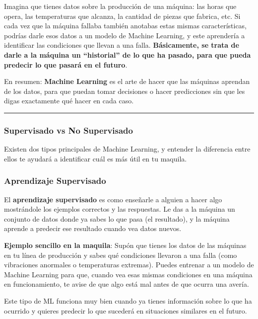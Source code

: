 \documentclass[
  10pt,
  letterpaper,
]{book}
\begin{document}
Imagina que tienes datos sobre la producción de una máquina: las horas
que opera, las temperaturas que alcanza, la cantidad de piezas que
fabrica, etc. Si cada vez que la máquina fallaba también anotabas estas
mismas características, podrías darle esos datos a un modelo de Machine
Learning, y este aprendería a identificar las condiciones que llevan a
una falla. \textbf{Básicamente, se trata de darle a la máquina un
``historial'' de lo que ha pasado, para que pueda predecir lo que pasará
en el futuro}.

En resumen: \textbf{Machine Learning} es el arte de hacer que las
máquinas aprendan de los datos, para que puedan tomar decisiones o hacer
predicciones sin que les digas exactamente qué hacer en cada caso.

\begin{center}\rule{0.5\linewidth}{0.5pt}\end{center}

\subsubsection{\texorpdfstring{\textbf{Supervisado vs No
Supervisado}}{Supervisado vs No Supervisado}}\label{supervisado-vs-no-supervisado}

Existen dos tipos principales de Machine Learning, y entender la
diferencia entre ellos te ayudará a identificar cuál es más útil en tu
maquila.

\subsubsection{\texorpdfstring{\textbf{Aprendizaje
Supervisado}}{Aprendizaje Supervisado}}\label{aprendizaje-supervisado}

El \textbf{aprendizaje supervisado} es como enseñarle a alguien a hacer
algo mostrándole los ejemplos correctos y las respuestas. Le das a la
máquina un conjunto de datos donde ya sabes lo que pasa (el resultado),
y la máquina aprende a predecir ese resultado cuando vea datos nuevos.

\textbf{Ejemplo sencillo en la maquila}: Supón que tienes los datos de
las máquinas en tu línea de producción y sabes qué condiciones llevaron
a una falla (como vibraciones anormales o temperaturas extremas). Puedes
entrenar a un modelo de Machine Learning para que, cuando vea esas
mismas condiciones en una máquina en funcionamiento, te avise de que
algo está mal antes de que ocurra una avería.

Este tipo de ML funciona muy bien cuando ya tienes información sobre lo
que ha ocurrido y quieres predecir lo que sucederá en situaciones
similares en el futuro.
\end{document}
